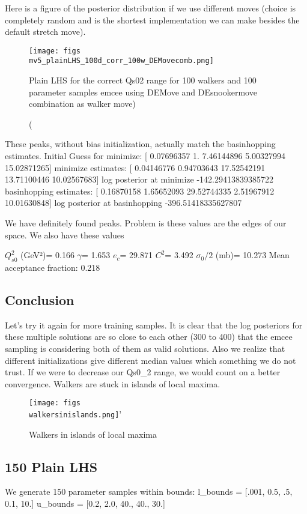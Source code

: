 \documentclass{article}
\begin{document}
Here is a figure of the posterior distribution if we use different moves (choice is completely random and is the shortest implementation we can make besides the default stretch move). 

\begin{figure}
\centering
\texttt{[image: figs\\mv5\_plainLHS\_100d\_corr\_100w\_DEMovecomb.png]}
\caption(Plain LHS for the correct Qs02 range for 100 walkers and 100 parameter samples emcee using DEMove and DEsnookermove combination as walker move)
\label{fig:mv5_plainLHS_100d_corr_100w_DEMovecomb}
\end{figure}

These peaks, without bias initialization, actually match the basinhopping estimates. 
Initial Guess for minimize:  [ 0.07696357  1.          7.46144896  5.00327994 15.02871265]
minimize estimates:  [ 0.04146776  0.94703643 17.52542191 13.71100446 10.02567683]
log posterior at minimize -142.29413839385722
basinhopping estimates:  [ 0.16870158  1.65652093 29.52744335  2.51967912 10.01630848]
log posterior at basinhopping -396.51418335627807

We have definitely found peaks. Problem is these values are the edges of our space. We also have these values

$Q_{s0}^{2}$ (GeV²)= 0.166
$\gamma$= 1.653
$e_c$= 29.871
$C^{2}$= 3.492
$\sigma_0/2$ (mb)= 10.273
Mean acceptance fraction: 0.218


\subsection{Conclusion}

Let's try it again for more training samples. It is clear that the log posteriors for these multiple solutions are so close to each other (300 to 400) that the emcee sampling is considering both of them as valid solutions. Also we realize that different initializations give different median values which something we do not trust. If we were to decrease our Qs0_2 range, we would count on a better convergence. Walkers are stuck in islands of local maxima. 

\begin{figure}
\centering
\texttt{[image: figs\\walkersinislands.png]}'
\caption{Walkers in islands of local maxima}
\end{figure}


\subsection{150 Plain LHS}
We generate 150 parameter samples within bounds: 	
l_bounds = [.001, 0.5, .5, 0.1, 10.]
u_bounds = [0.2, 2.0, 40., 40., 30.]
\end{document}
